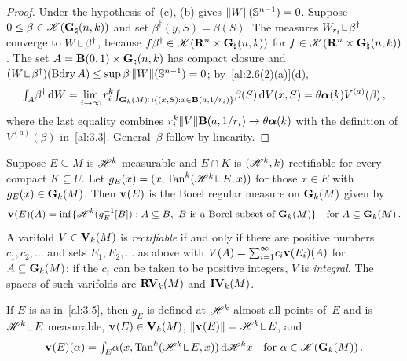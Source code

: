 \begin{proof}
    Under the hypothesis of~(c), (b) gives $\|W\|(\mathbb{S}^{n-1}) = 0$. Suppose $0 \le \beta
    \in \mathscr{K}(\mathbf{G}_{\natural}(n,k))$ and set $\beta^\dagger(y,S) = \beta(S)$. The measures
    $W_{r_i} \restrict \beta^\dagger$ converge to $W \restrict \beta^\dagger$, because $f
    \beta^\dagger \in \mathscr{K}(\mathbf{R}^{n} \times \mathbf{G}_{\natural}(n,k))$ for $f \in
    \mathscr{K}(\mathbf{R}^{n} \times \mathbf{G}_{\natural}(n,k))$. The set $A = \mathbf{B}(0,1) \times
    \mathbf{G}_{\natural}(n,k)$ has compact closure and $(W \restrict \beta^\dagger)(\Bdry A) \le \sup
    \beta \, \|W\|(\sphere{\adim-1}) = 0$; by~\ref{al:2.6(2)(a)}(d),
    \begin{displaymath}
        {\textstyle\int_{A}^{}} \beta^\dagger \,\mathrm{d} W = \lim_{i \to \infty} r_i^{k} {\textstyle\int_{\mathbf{G}_{k}(M) \cap \{
        (x,S) : x \in \mathbf{B}(a,1/r_i) \}}^{}} \beta(S) \,\mathrm{d} V(x,S) = \theta \boldsymbol{\alpha}(k)
        V^{(a)}(\beta) \,,
    \end{displaymath}
    where the last equality combines $r_i^{k} \|V\| \mathbf{B}(a,1/r_i) \to \theta
    \boldsymbol{\alpha}(k)$ with the definition of $V^{(a)}(\beta)$ in~\ref{al:3.3}. General~$\beta$
    follow by linearity.
\end{proof}

\begin{definition}
    \label{al:3.5}
    Suppose $E \subseteq M$ is $\mathscr{H}^{k}$ measurable and $E \cap K$ is $(\mathscr{H}^{k},k)$
    rectifiable for every compact $K \subseteq U$. Let $g_E(x) = (x, \Tan^{\vdim}(\HM^{\vdim}
    \restrict E, x))$ for those $x \in E$ with $g_E(x) \in \mathbf{G}_{k}(M)$. Then $\mathbf{v}_{}(E)$ is the
    Borel regular measure on $\mathbf{G}_{k}(M)$ given by
    \begin{displaymath}
        \mathbf{v}_{}(E)(A) = \inf \{ \mathscr{H}^{k}(g_E^{-1}[B]) : A \subseteq B,\ B \text{ is a Borel
        subset of } \mathbf{G}_{k}(M) \} \quad \text{for $A \subseteq \mathbf{G}_{k}(M)$} \,.
    \end{displaymath}
    A varifold $V \in \mathbf{V}_{k}(M)$ is \emph{rectifiable} if and only if there are positive
    numbers $c_1, c_2, \ldots$ and sets $E_1, E_2, \ldots$ as above with $V(A) =
    {\textstyle\sum_{i=1}^{\infty}} c_i \mathbf{v}_{}(E_i)(A)$ for $A \subseteq \mathbf{G}_{k}(M)$; if the $c_i$ can be taken
    to be positive integers, $V$ is \emph{integral}. The spaces of such varifolds are
    $\mathbf{RV}_{k}(M)$ and $\mathbf{IV}_{k}(M)$.
\end{definition}

\begin{lemma}
    \label{al:3.5:lem}
    If $E$ is as in~\ref{al:3.5}, then $g_E$ is defined at $\mathscr{H}^{k}$ almost all points
    of~$E$ and is $\HM^{\vdim} \restrict E$ measurable, $\mathbf{v}_{}(E) \in \mathbf{V}_{k}(M)$, $\|
    \var{}(E) \| = \HM^{\vdim} \restrict E$, and
    \begin{displaymath}
        \var{}(E)(\alpha) = \textint{E}{} \alpha(x, \Tan^{\vdim}(\HM^{\vdim} \restrict E, x)) \ud
        \HM^{\vdim} x \quad \text{for $\alpha \in \ccspace{\Gk{M}}$} \,.
    \end{displaymath}
\end{lemma}

